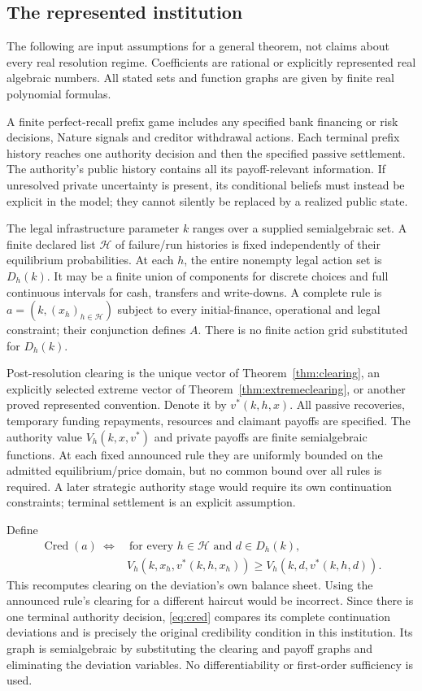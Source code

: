 \documentclass[11pt,a4paper]{article}
\numberwithin{equation}{section}
\theoremstyle{definition}
\newcommand{\Cred}{\operatorname{Cred}}
\begin{document}
\subsection{The represented institution}
The following are input assumptions for a general theorem, not claims
about every real resolution regime. Coefficients are rational or explicitly
represented real algebraic numbers. All stated sets and function graphs
are given by finite real polynomial formulas.

A finite perfect-recall prefix game includes any specified bank financing
or risk decisions, Nature signals and creditor withdrawal actions. Each
terminal prefix history reaches one authority decision and then the
specified passive settlement. The authority's public history contains all
its payoff-relevant information. If unresolved private uncertainty is
present, its conditional beliefs must instead be explicit in the model;
they cannot silently be replaced by a realized public state.

The legal infrastructure parameter \(k\) ranges over a supplied
semialgebraic set. A finite declared list \(\mathcal H\) of failure/run
histories is fixed independently of their equilibrium probabilities.
At each \(h\), the entire nonempty legal action set is \(D_h(k)\).
It may be a finite union of components for discrete choices and full
continuous intervals for cash, transfers and write-downs. A complete rule
is \(a=(k,(x_h)_{h\in\mathcal H})\) subject to every initial-finance,
operational and legal constraint; their conjunction defines \(A\).
There is no finite action grid substituted for \(D_h(k)\).

Post-resolution clearing is the unique vector of
Theorem~\ref{thm:clearing}, an explicitly selected extreme vector of
Theorem~\ref{thm:extremeclearing}, or another proved represented convention.
Denote it by \(v^*(k,h,x)\). All passive recoveries, temporary funding
repayments, resources and claimant payoffs are specified. The authority
value \(V_h(k,x,v^*)\) and private payoffs are finite semialgebraic
functions. At each fixed announced rule they are uniformly bounded on the
admitted equilibrium/price domain, but no common bound over all rules
is required. A later strategic authority stage would require its own
continuation constraints; terminal settlement is an explicit assumption.

Define
\begin{equation}\label{eq:cred}
\begin{aligned}
\Cred(a)\ \Longleftrightarrow&
\ \text{for every }h\in\mathcal H\text{ and }d\in D_h(k),\\
&V_h(k,x_h,v^*(k,h,x_h))\ge V_h(k,d,v^*(k,h,d)).
\end{aligned}
\end{equation}
This recomputes clearing on the deviation's own balance sheet. Using the
announced rule's clearing for a different haircut would be incorrect.
Since there is one terminal authority decision, \eqref{eq:cred} compares
its complete continuation deviations and is precisely the original
credibility condition in this institution. Its graph is semialgebraic by
substituting the clearing and payoff graphs and eliminating the deviation
variables. No differentiability or first-order sufficiency is used.
\end{document}
